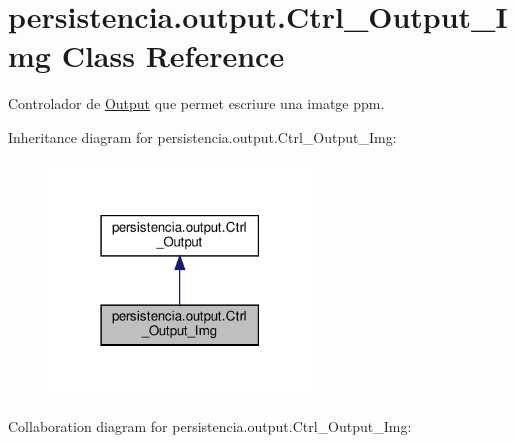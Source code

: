 \hypertarget{classpersistencia_1_1output_1_1Ctrl__Output__Img}{}\section{persistencia.\+output.\+Ctrl\+\_\+\+Output\+\_\+\+Img Class Reference}
\label{classpersistencia_1_1output_1_1Ctrl__Output__Img}


Controlador de \hyperlink{classpersistencia_1_1output_1_1Output}{Output} que permet escriure una imatge ppm.  




Inheritance diagram for persistencia.\+output.\+Ctrl\+\_\+\+Output\+\_\+\+Img\+:\nopagebreak
\begin{figure}[H]
\begin{center}
\leavevmode
\includegraphics[width=198pt]{classpersistencia_1_1output_1_1Ctrl__Output__Img__inherit__graph}
\end{center}
\end{figure}


Collaboration diagram for persistencia.\+output.\+Ctrl\+\_\+\+Output\+\_\+\+Img\+:
